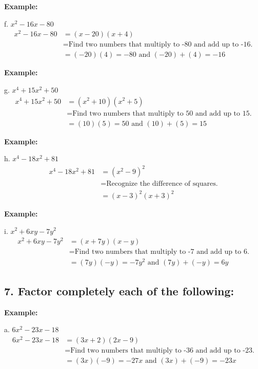 \documentclass[12pt,a4paper]{article}
\newenvironment{example}
  {\begin{framed}\colorbox{examplecolor}{
  \parbox{\dimexpr\linewidth-2\fboxsep}{
  \textbf{Example:}}}}
  {\end{framed}}
\begin{document}
\begin{example}
f. $x^2 - 16x - 80$
\begin{align*}
x^2 - 16x - 80 &= (x - 20)(x + 4) \\
&= \text{Find two numbers that multiply to -80 and add up to -16.} \\
&= (-20)(4) = -80 \text{ and } (-20) + (4) = -16
\end{align*}
\end{example}

\begin{example}
g. $x^4 + 15x^2 + 50$
\begin{align*}
x^4 + 15x^2 + 50 &= (x^2 + 10)(x^2 + 5) \\
&= \text{Find two numbers that multiply to 50 and add up to 15.} \\
&= (10)(5) = 50 \text{ and } (10) + (5) = 15
\end{align*}
\end{example}

\begin{example}
h. $x^4 - 18x^2 + 81$
\begin{align*}
x^4 - 18x^2 + 81 &= (x^2 - 9)^2 \\
&= \text{Recognize the difference of squares.} \\
&= (x - 3)^2(x + 3)^2
\end{align*}
\end{example}

\begin{example}
i. $x^2 + 6xy - 7y^2$
\begin{align*}
x^2 + 6xy - 7y^2 &= (x + 7y)(x - y) \\
&= \text{Find two numbers that multiply to -7 and add up to 6.} \\
&= (7y)(-y) = -7y^2 \text{ and } (7y) + (-y) = 6y
\end{align*}
\end{example}

\newpage 
\subsection*{7. Factor completely each of the following:}

\begin{example}
a. $6x^2 - 23x - 18$
\begin{align*}
6x^2 - 23x - 18 &= (3x + 2)(2x - 9) \\
&= \text{Find two numbers that multiply to -36 and add up to -23.} \\
&= (3x)(-9) = -27x \text{ and } (3x) + (-9) = -23x
\end{align*}
\end{example}
\end{document}
